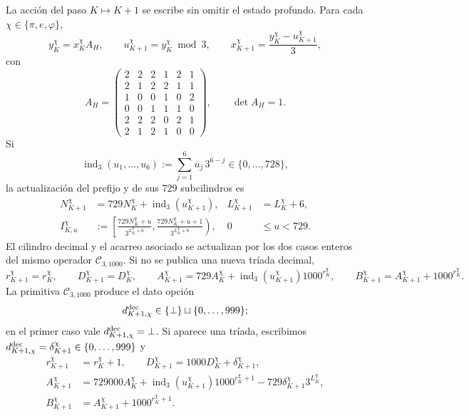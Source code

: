 La acción del paso \(K\mapsto K+1\) se escribe sin omitir el estado profundo.
Para cada \(\chi\in\{\pi,e,\varphi\}\),
\begin{equation}
\label{eq:continuo-comun-update-hensel-tpk}
 y_K^\chi=x_K^\chi A_H,\qquad
 u_{K+1}^\chi=y_K^\chi\bmod3,\qquad
 x_{K+1}^\chi=\frac{y_K^\chi-u_{K+1}^\chi}{3},
\end{equation}
con
\[
 A_H=
 \begin{pmatrix}
 2&2&2&1&2&1\\
 2&1&2&2&1&1\\
 1&0&0&1&0&2\\
 0&0&1&1&1&0\\
 2&2&2&0&2&1\\
 2&1&2&1&0&0
 \end{pmatrix},
 \qquad \det A_H=1.
\]
Si
\[
 \operatorname{ind}_3(u_1,\ldots,u_6)
 :=\sum_{j=1}^{6}\overline u_j\,3^{6-j}
 \in\{0,\ldots,728\},
\]
la actualización del prefijo y de sus \(729\) subcilindros es
\begin{align}
 N_{K+1}^\chi
 &=729N_K^\chi+\operatorname{ind}_3(u_{K+1}^\chi),
 &L_{K+1}^\chi&=L_K^\chi+6,
 \label{eq:continuo-comun-update-cilindro-indice}\\
 I_{K,u}^\chi
 &:=
 \left[
  \frac{729N_K^\chi+u}{3^{L_K^\chi+6}},
  \frac{729N_K^\chi+u+1}{3^{L_K^\chi+6}}
 \right),
 &0&\leq u<729.
 \label{eq:continuo-comun-update-cilindro-intervalo}
\end{align}
El cilindro decimal y el acarreo asociado se actualizan por los dos casos
enteros del mismo operador \(\mathcal C_{3,1000}\). Si no se publica una
nueva tríada decimal,
\begin{equation}
\label{eq:continuo-comun-update-cilindro-sin-triada}
 r_{K+1}^\chi=r_K^\chi,\qquad D_{K+1}^\chi=D_K^\chi,\qquad
 A_{K+1}^\chi=729A_K^\chi+
 \operatorname{ind}_3(u_{K+1}^\chi)1000^{r_K^\chi},\qquad
 B_{K+1}^\chi=A_{K+1}^\chi+1000^{r_K^\chi}.
\end{equation}
La primitiva \(\mathcal C_{3,1000}\) produce el dato opción
\[
 d_{K+1,\chi}^{\rm dec}\in
 \{\bot\}\sqcup\{0,\ldots,999\};
\]
en el primer caso vale \(d_{K+1,\chi}^{\rm dec}=\bot\). Si aparece una
tríada, escribimos
\(d_{K+1,\chi}^{\rm dec}=\delta_{K+1}^\chi\in\{0,\ldots,999\}\) y
\begin{equation}
\label{eq:continuo-comun-update-cilindro-con-triada}
 \begin{aligned}
 r_{K+1}^\chi&=r_K^\chi+1,\qquad
 D_{K+1}^\chi=1000D_K^\chi+\delta_{K+1}^\chi,\\
 A_{K+1}^\chi&=729000A_K^\chi
 +\operatorname{ind}_3(u_{K+1}^\chi)1000^{r_K^\chi+1}
 -729\delta_{K+1}^\chi3^{L_K^\chi},\\
 B_{K+1}^\chi&=A_{K+1}^\chi+1000^{r_K^\chi+1}.
 \end{aligned}
\end{equation}
